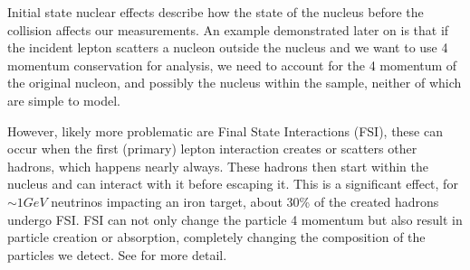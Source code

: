 \documentclass[a4paper,12pt]{article}
\newcommand{\efn}{e4$\nu$}
\begin{document}
Initial state nuclear effects describe how the state of the nucleus before the collision affects our measurements.
An example demonstrated later on is that if the incident lepton scatters a nucleon outside the nucleus and we want to use 4 momentum conservation for analysis, we need to account for the 4 momentum of the original nucleon, and possibly the nucleus within the sample, neither of which are simple to model.

However, likely more problematic are Final State Interactions (FSI), these can occur when the first (primary) lepton interaction creates or scatters other hadrons, which happens nearly always.
These hadrons then start within the nucleus and can interact with it before escaping it.
This is a significant effect, for $\sim 1\si{GeV}$ neutrinos impacting an iron target, about 30\% of the created hadrons undergo FSI\cite{stevendytmanFinalStateInteractions2009}.
FSI can not only change the particle 4 momentum but also result in particle creation or absorption, completely changing the composition of the particles we detect.
See \cite{golanEffectsFinalstateInteractions2012,stevendytmanFinalStateInteractions2009} for more detail.



\end{document}
